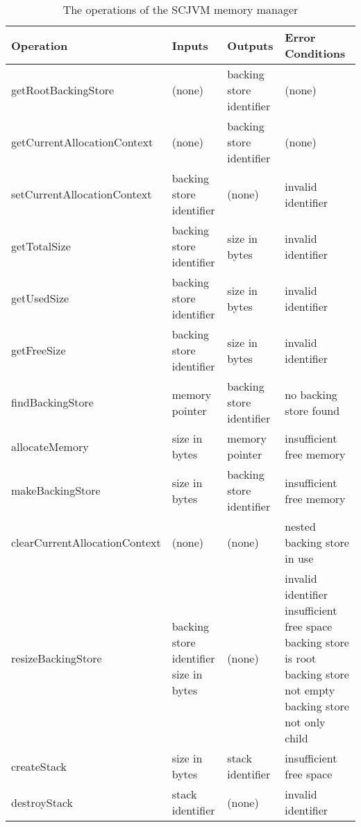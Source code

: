 \documentclass[a4paper,10pt]{report}
\begin{document}
\begin{table}[ht]
  \centering
  \footnotesize
  \begin{tabular}{|l|p{3cm}|p{3cm}|p{3.6cm}|}
    Operation & Inputs & Outputs & Error Conditions \\
    \hline
    getRootBackingStore &
      (none) &
      backing store identifier &
      (none)
    \\getCurrentAllocationContext &
      (none) &
      backing store identifier &
      (none)
    \\setCurrentAllocationContext &
      backing store identifier &
      (none) &
      invalid identifier
    \\getTotalSize &
      backing store identifier &
      size in bytes &
      invalid identifier
    \\getUsedSize &
      backing store identifier &
      size in bytes &
      invalid identifier
    \\getFreeSize &
      backing store identifier &
      size in bytes &
      invalid identifier
    \\findBackingStore &
      memory pointer &
      backing store identifier &
      no backing store found
    \\allocateMemory &
      size in bytes &
      memory pointer &
      insufficient free memory
    \\makeBackingStore &
      size in bytes & 
      backing store identifier &
      insufficient free memory
    \\clearCurrentAllocationContext &
      (none) &
      (none) &
      nested backing store in use
    \\resizeBackingStore &
      backing store identifier \newline
      size in bytes &
      (none) &
      invalid identifier \newline
      insufficient free space \newline
      backing store is root \newline
      backing store not empty \newline
      backing store not only child
    \\createStack &
      size in bytes &
      stack identifier &
      insufficient free space
    \\destroyStack &
      stack identifier &
      (none) &
      invalid identifier
  \end{tabular}
  \caption{The operations of the SCJVM memory manager}
  \label{memory-manager-table}
\end{table}
\end{document}
